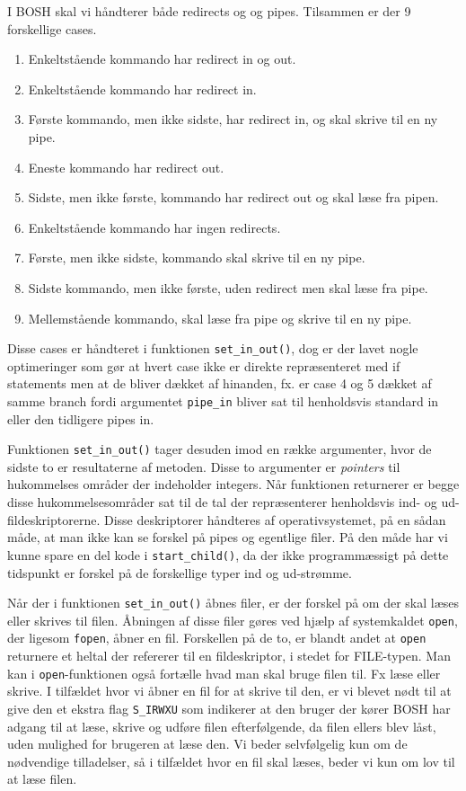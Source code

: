 I BOSH skal vi håndterer både redirects og og pipes. Tilsammen er der 9 forskellige cases.
\begin{enumerate}
	\item Enkeltstående kommando har redirect in og out.
	\item Enkeltstående kommando har redirect in.
	\item Første kommando, men ikke sidste, har redirect in, og skal skrive til en ny pipe.
	\item Eneste kommando har redirect out.
	\item Sidste, men ikke første, kommando har redirect out og skal læse fra pipen.
	\item Enkeltstående kommando har ingen redirects.
	\item Første, men ikke sidste, kommando skal skrive til en ny pipe.
	\item Sidste kommando, men ikke første, uden redirect men skal læse fra pipe.
	\item Mellemstående kommando, skal læse fra pipe og skrive til en ny pipe.
\end{enumerate}

Disse cases er håndteret i funktionen \verb+set_in_out()+, dog er der lavet nogle optimeringer som gør at hvert case ikke er direkte repræsenteret med if statements men at de bliver dækket af hinanden, fx. er case 4 og 5 dækket af samme branch fordi argumentet \texttt{pipe\_in} bliver sat til henholdsvis standard in eller den tidligere pipes in.

Funktionen \texttt{set\_in\_out()} tager desuden imod en række argumenter, hvor de sidste to er resultaterne af metoden. Disse to argumenter er \textit{pointers} til hukommelses områder der indeholder integers. Når funktionen returnerer er begge disse hukommelsesområder sat til de tal der repræsenterer henholdsvis ind- og ud-fildeskriptorerne. Disse deskriptorer håndteres af operativsystemet, på en sådan måde, at man ikke kan se forskel på pipes og egentlige filer. På den måde har vi kunne spare en del kode i \texttt{start\_child()}, da der ikke programmæssigt på dette tidspunkt er forskel på de forskellige typer ind og ud-strømme.

Når der i funktionen \texttt{set\_in\_out()} åbnes filer, er der forskel på om der skal læses eller skrives til filen. Åbningen af disse filer gøres ved hjælp af systemkaldet \texttt{open}, der ligesom \texttt{fopen}, åbner en fil. Forskellen på de to, er blandt andet at \texttt{open} returnere et heltal der refererer til en fildeskriptor, i stedet for FILE-typen. Man kan i \texttt{open}-funktionen også fortælle hvad man skal bruge filen til. Fx læse eller skrive. I tilfældet hvor vi åbner en fil for at skrive til den, er vi blevet nødt til at give den et ekstra flag \texttt{S\_IRWXU} som indikerer at den bruger der kører BOSH har adgang til at læse, skrive og udføre filen efterfølgende, da filen ellers blev låst, uden mulighed for brugeren at læse den. Vi beder selvfølgelig kun om de nødvendige tilladelser, så i tilfældet hvor en fil skal læses, beder vi kun om lov til at læse filen.


